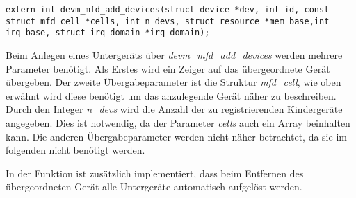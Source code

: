 \begin{lstfloat}
\begin{lstlisting}
extern int devm_mfd_add_devices(struct device *dev, int id, const struct mfd_cell *cells, int n_devs, struct resource *mem_base,int irq_base, struct irq_domain *irq_domain);
\end{lstlisting}
\end{lstfloat}

Beim Anlegen eines Untergeräts über \textit{devm\_mfd\_add\_devices} werden mehrere Parameter benötigt. 
Als Erstes wird ein Zeiger auf das übergeordnete Gerät übergeben. Der zweite Übergabeparameter ist die Struktur \textit{mfd\_cell}, wie oben erwähnt wird diese benötigt um das anzulegende Gerät näher zu beschreiben.
Durch den Integer \textit{n\_devs} wird die Anzahl der zu registrierenden Kindergeräte angegeben. Dies ist notwendig, da der Parameter \textit{cells} auch ein Array beinhalten kann. 
Die anderen Übergabeparameter werden nicht näher betrachtet, da sie im folgenden nicht benötigt werden. \cite[Zeile 359ff.]{linuxsourcedriver} %


In der Funktion ist zusätzlich implementiert, dass beim Entfernen des übergeordneten Gerät alle Untergeräte automatisch aufgelöst werden. \cite[Zeile 356f.]{linuxsourcedriver}%



